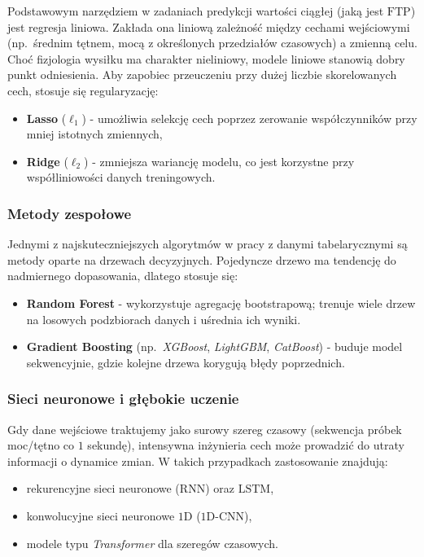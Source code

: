 Podstawowym narzędziem w zadaniach predykcji wartości ciągłej (jaką jest $\mathrm{FTP}$) jest regresja liniowa.
Zakłada ona liniową zależność między cechami wejściowymi (np.\ średnim tętnem, mocą z określonych przedziałów czasowych) a zmienną celu.
Choć fizjologia wysiłku ma charakter nieliniowy, modele liniowe stanowią dobry punkt odniesienia.
Aby zapobiec przeuczeniu przy dużej liczbie skorelowanych cech, stosuje się regularyzację:
\begin{itemize}
  \item \textbf{Lasso} ($\ell_1$) - umożliwia selekcję cech poprzez zerowanie współczynników przy mniej istotnych zmiennych,
  \item \textbf{Ridge} ($\ell_2$) - zmniejsza wariancję modelu, co jest korzystne przy współliniowości danych treningowych.
\end{itemize}

\subsubsection{Metody zespołowe}

Jednymi z najskuteczniejszych algorytmów w pracy z danymi tabelarycznymi są metody oparte na drzewach decyzyjnych.
Pojedyncze drzewo ma tendencję do nadmiernego dopasowania, dlatego stosuje się:
\begin{itemize}
  \item \textbf{Random Forest} - wykorzystuje agregację bootstrapową; trenuje wiele drzew na losowych podzbiorach danych i uśrednia ich wyniki.
  \item \textbf{Gradient Boosting} (np.\ \textit{XGBoost}, \textit{LightGBM}, \textit{CatBoost}) - buduje model sekwencyjnie, gdzie kolejne drzewa korygują błędy poprzednich.
\end{itemize}

\subsubsection{Sieci neuronowe i głębokie uczenie}

Gdy dane wejściowe traktujemy jako surowy szereg czasowy (sekwencja próbek moc/tętno co $1$ sekundę), intensywna inżynieria cech może prowadzić do utraty informacji o dynamice zmian.
W takich przypadkach zastosowanie znajdują:
\begin{itemize}
  \item rekurencyjne sieci neuronowe ($\mathrm{RNN}$) oraz $\mathrm{LSTM}$,
  \item konwolucyjne sieci neuronowe $1\mathrm{D}$ ($1\mathrm{D}$-$\mathrm{CNN}$),
  \item modele typu \textit{Transformer} dla szeregów czasowych.
\end{itemize}

